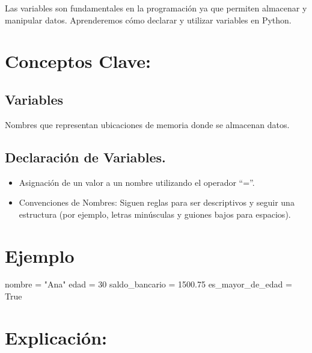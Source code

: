 \documentclass[
  a4paper,
  DIV=11,
  numbers=noendperiod,
  onepage,
  openany]{scrreprt}
\newenvironment{Shaded}{\begin{snugshade}}{\end{snugshade}}
\newcommand{\DecValTok}[1]{\textcolor[rgb]{0.68,0.00,0.00}{#1}}
\newcommand{\FloatTok}[1]{\textcolor[rgb]{0.68,0.00,0.00}{#1}}
\newcommand{\NormalTok}[1]{\textcolor[rgb]{0.00,0.23,0.31}{#1}}
\newcommand{\OperatorTok}[1]{\textcolor[rgb]{0.37,0.37,0.37}{#1}}
\newcommand{\StringTok}[1]{\textcolor[rgb]{0.13,0.47,0.30}{#1}}
\newcommand{\VariableTok}[1]{\textcolor[rgb]{0.07,0.07,0.07}{#1}}
\providecommand{\tightlist}{%
  \setlength{\itemsep}{0pt}\setlength{\parskip}{0pt}}\usepackage{longtable,booktabs,array}
\begin{document}
Las variables son fundamentales en la programación ya que permiten
almacenar y manipular datos. Aprenderemos cómo declarar y utilizar
variables en Python.

\hypertarget{conceptos-clave-11}{%
\section{Conceptos Clave:}\label{conceptos-clave-11}}

\hypertarget{variables-5}{%
\subsection{Variables}\label{variables-5}}

Nombres que representan ubicaciones de memoria donde se almacenan datos.

\hypertarget{declaraciuxf3n-de-variables.-1}{%
\subsection{Declaración de
Variables.}\label{declaraciuxf3n-de-variables.-1}}

\begin{itemize}
\tightlist
\item
  Asignación de un valor a un nombre utilizando el operador ``=''.
\item
  Convenciones de Nombres: Siguen reglas para ser descriptivos y seguir
  una estructura (por ejemplo, letras minúsculas y guiones bajos para
  espacios).
\end{itemize}

\hypertarget{ejemplo-11}{%
\section{Ejemplo}\label{ejemplo-11}}

\begin{Shaded}
\begin{Highlighting}[]
\NormalTok{nombre }\OperatorTok{=} \StringTok{"Ana"}
\NormalTok{edad }\OperatorTok{=} \DecValTok{30}
\NormalTok{saldo\_bancario }\OperatorTok{=} \FloatTok{1500.75}
\NormalTok{es\_mayor\_de\_edad }\OperatorTok{=} \VariableTok{True}
\end{Highlighting}
\end{Shaded}

\hypertarget{explicaciuxf3n-11}{%
\section{Explicación:}\label{explicaciuxf3n-11}}
\end{document}
